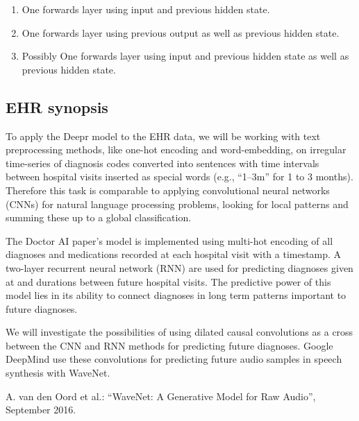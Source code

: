 	


	
	\begin{enumerate}
		\item One forwards layer using input and previous hidden state.
		\item One forwards layer using previous output as well as previous hidden state.
		\item Possibly One forwards layer using input and previous hidden state as well as previous hidden state.
	\end{enumerate}

\subsection*{EHR synopsis}

To apply the Deepr model to the EHR data, we will be working with text preprocessing methods, like one-hot encoding and word-embedding, on irregular time-series of diagnosis codes converted into sentences with time intervals between hospital visits inserted as special words (e.g., “1--3m” for 1 to 3 months). Therefore this task is comparable to applying convolutional neural networks (CNNs) for natural language processing problems, looking for local patterns and summing these up to a global classification.

The Doctor AI paper’s model is implemented using multi-hot encoding of all diagnoses and medications recorded at each hospital visit with a timestamp. A two-layer recurrent neural network (RNN) are used for predicting diagnoses given at and durations between future hospital visits. The predictive power of this model lies in its ability to connect diagnoses in long term patterns important to future diagnoses.

We will investigate the possibilities of using dilated causal convolutions as a cross between the CNN and RNN methods for predicting future diagnoses. Google DeepMind use these convolutions for predicting future audio samples in speech synthesis with WaveNet.

A. van den Oord et al.: “WaveNet: A Generative Model for Raw Audio”, September 2016.

